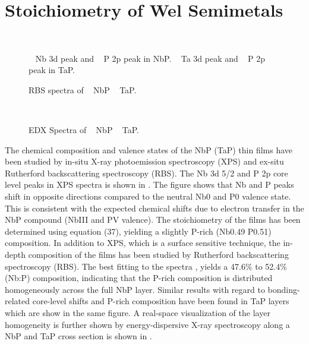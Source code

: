 \section{Stoichiometry of Wel Semimetals}

\begin{figure}
    \centering
    \\
    \caption{
        \sfA~ Nb 3d peak and
        \sfB~ P 2p peak in 
        NbP. 
        \sfC~ Ta 3d peak and
        \sfD~ P 2p peak in 
        TaP.
    }
\end{figure}

\begin{figure}
    \centering
    \caption{
        RBS spectra of 
        \sfA~ NbP
        \sfB~ TaP.
    }
\end{figure}

\begin{figure}
    \centering
    \\
    \caption{
        EDX Spectra of
        \sfA~ NbP
        \sfB~ TaP.
    }
\end{figure}

The chemical composition and valence states of the NbP (TaP) thin films have
 been studied by in-situ X-ray photoemission spectroscopy (XPS) and ex-situ 
 Rutherford backscattering spectroscopy (RBS).  The Nb 3d 5/2 and P 2p core 
 level peaks in XPS spectra is shown in . The figure shows that Nb 
 and P peaks shift in opposite directions compared to the neutral Nb0 and P0 
 valence state. This is consistent with the expected chemical shifts due to 
 electron transfer in the NbP compound (NbIII and PV valence). The stoichiometry 
 of the films has been determined using equation (37), yielding a slightly P-rich 
 (Nb0.49 P0.51) composition. In addition to XPS, which is a surface sensitive technique,
  the in-depth composition of the films has been studied by Rutherford backscattering 
  spectroscopy (RBS). The best fitting to the spectra , yields a 
  47.6\% to 52.4\% (Nb:P) composition, indicating that the P-rich composition 
  is distributed homogeneously across the full NbP layer.  Similar results with regard 
  to bonding-related core-level shifts and P-rich composition have been found in TaP 
  layers which  are show in the same figure. A real-space visualization of the layer 
  homogeneity is further shown by energy-dispersive X-ray spectroscopy along a NbP and 
  TaP cross section is shown in .

